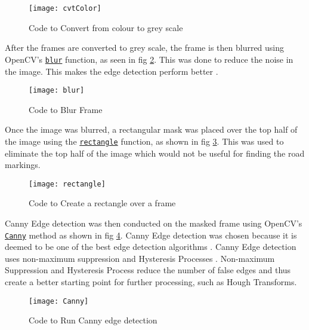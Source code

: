 \documentclass[conference]{IEEEtran}
\begin{document}
\begin{figure}[H]
\centerline{\texttt{[image: cvtColor]}}
\caption{Code to Convert from colour to grey scale}
\label{fig:cvtColor}
\end{figure}

After the frames are converted to grey scale, the frame is then blurred using OpenCV's \href{https://docs.opencv.org/4.x/d4/d86/group__imgproc__filter.html#ga8c45db9afe636703801b0b2e440fce37}{\texttt{blur}} function, as seen in fig \ref{fig:blur}. This was done to reduce the noise in the image. This makes the edge detection perform better \cite{Image_Blurring}.

\begin{figure}[H]
\centerline{\texttt{[image: blur]}}
\caption{Code to Blur Frame}
\label{fig:blur}
\end{figure} 

Once the image was blurred, a rectangular mask was placed over the top half of the image using the \href{https://docs.opencv.org/4.x/d6/d6e/group__imgproc__draw.html#ga07d2f74cadcf8e305e810ce8eed13bc9}{\texttt{rectangle}} function, as shown in fig \ref{fig:rectangle}. This was used to eliminate the top half of the image which would not be useful for finding the road markings. 

\begin{figure}[H]
\centerline{\texttt{[image: rectangle]}}
\caption{Code to Create a rectangle over a frame}
\label{fig:rectangle}
\end{figure}
 
Canny Edge detection was then conducted on the masked frame using OpenCV's \href{https://docs.opencv.org/4.x/dd/d1a/group__imgproc__feature.html#ga04723e007ed888ddf11d9ba04e2232de}{\texttt{Canny}} method as shown in fig \ref{fig:Canny}. Canny Edge detection was chosen because it is deemed to be one of the best edge detection algorithms \cite{Canny2009CannyED}. Canny Edge detection uses non-maximum suppression \cite{non-maximum_supression} and Hysteresis Processes \cite{Hysteresis_Thresholding}. Non-maximum Suppression and Hysteresis Process reduce the number of false edges and thus create a better starting point for further processing, such as Hough Transforms. 

\begin{figure}[H]
\centerline{\texttt{[image: Canny]}}
\caption{Code to Run Canny edge detection}
\label{fig:Canny}
\end{figure}
\end{document}
